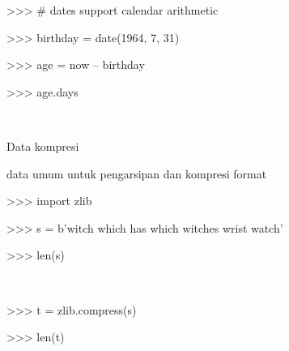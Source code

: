 \documentclass[a4paper,12pt]{report}
\begin{document}
\vspace{14pt}
\noindent 
{\fontsize{14pt}{14pt}\selectfont >>>  $  \#  $ dates support calendar arithmetic \\} \par
\vspace{14pt}
\noindent 
{\fontsize{14pt}{14pt}\selectfont >>> birthday = date(1964, 7, 31) \\} \par
\vspace{14pt}
\noindent 
{\fontsize{14pt}{14pt}\selectfont >>> age = now – birthday \\} \par
\vspace{14pt}
\noindent 
{\fontsize{14pt}{14pt}\selectfont >>> age.days \\} \par
\noindent 
{\fontsize{14pt}{14pt} \\} \par
\vspace{14pt}
\noindent 
{\fontsize{14pt}{14pt}\selectfont Data kompresi  \\} \par
\noindent 
{\fontsize{14pt}{14pt}\selectfont data umum untuk pengarsipan dan kompresi format \\} \par
\vspace{14pt}
\noindent 
{\fontsize{14pt}{14pt}\selectfont >>> import zlib \\} \par
\vspace{14pt}
\noindent 
{\fontsize{14pt}{14pt}\selectfont >>> s = b'witch which has which witches wrist watch' \\} \par
\vspace{14pt}
\noindent 
{\fontsize{14pt}{14pt}\selectfont >>> len(s) \\} \par
\noindent 
{\fontsize{14pt}{14pt} \\} \par
\vspace{14pt}
\noindent 
{\fontsize{14pt}{14pt}\selectfont >>> t = zlib.compress(s) \\} \par
\vspace{14pt}
\noindent 
{\fontsize{14pt}{14pt}\selectfont >>> len(t) \\} \par
\noindent 
\end{document}

